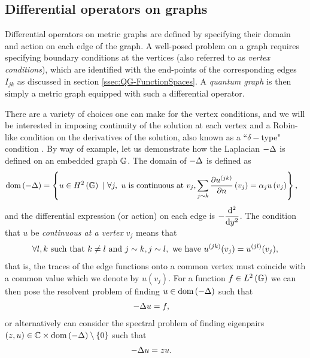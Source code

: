 \subsection{Differential operators on graphs} \label{ssec:DiffOpsOnGraphs}
Differential operators on metric graphs are defined by specifying their domain and action on each edge of the graph.
A well-posed problem on a graph requires specifying boundary conditions at the vertices (also referred to as \emph{vertex conditions}), which are identified with the end-points of the corresponding edges $I_{jk}$ as discussed in section \ref{ssec:QG-FunctionSpaces}.
A \emph{quantum graph} is then simply a metric graph equipped with such a differential operator.

There are a variety of choices one can make for the vertex conditions, and we will be interested in imposing continuity of the solution at each vertex and a Robin-like condition on the derivatives of the solution, also known as a ``$\delta-$type" condition \cite{berkolaiko2013introduction, albeverio2012solvable}.
By way of example, let us demonstrate how the Laplacian $-\Delta$ is defined on an embedded graph $\mathbb{G}$.
The domain of $-\Delta$ is defined as
\begin{align} \label{eq:GraphLaplacianExample}
	\mathrm{dom}\left( -\Delta \right) &= \left\{  u\in H^2\left( \mathbb{G} \right) \ \vert \ \forall j, \ u \text{ is continuous at } v_j, \sum_{j\sim k}\dfrac{\partial u^{(jk)}}{\partial n}\left( v_j \right) = \alpha_j u\left( v_j \right)  \right\},
\end{align}
and the differential expression (or action) on each edge is $-\dfrac{\mathrm{d}^2 }{\mathrm{d} {y}^2}$.
The condition that $u$ be \emph{continuous at a vertex} $v_j$ means that
\begin{align*}
	\forall l,k \text{ such that } k\neq l \text{ and } j\sim k, j\sim l, \text{ we have } u^{(jk)}(v_j) = u^{(jl)}(v_j),
\end{align*}
that is, the traces of the edge functions onto a common vertex must coincide with a common value which we denote by $u(v_j)$.
For a function $f\in L^2\left( \mathbb{G} \right)$ we can then pose the resolvent problem of finding $u\in\mathrm{dom}\left( -\Delta \right)$ such that
\begin{align*}
	-\Delta u &= f,
\end{align*}
or alternatively can consider the spectral problem of finding eigenpairs $\left( z,u \right)\in\mathbb{C}\times\mathrm{dom}\left( -\Delta \right)\setminus\left\{ 0 \right\}$ such that
\begin{align*}
	-\Delta u &= z u.
\end{align*}
